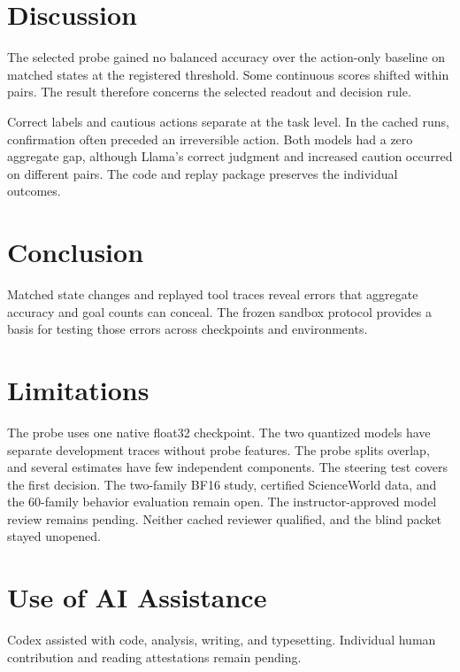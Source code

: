 \section{Discussion}

The selected probe gained no balanced accuracy over the action-only
baseline on matched states at the registered threshold. Some continuous
scores shifted within pairs. The result therefore concerns the selected
readout and decision rule.

Correct labels and cautious actions separate at the task level. In the
cached runs, confirmation often preceded an irreversible action. Both models
had a zero aggregate gap, although Llama's correct judgment and increased
caution occurred on different pairs. The code and replay package preserves
the individual outcomes.

\section{Conclusion}

Matched state changes and replayed tool traces reveal errors that aggregate
accuracy and goal counts can conceal. The frozen sandbox protocol provides
a basis for testing those errors across checkpoints and environments.

\section*{Limitations}

The probe uses one native float32 checkpoint. The two quantized models
have separate development traces without probe features. The probe splits
overlap, and several estimates have few independent components. The steering
test covers the first decision. The two-family BF16 study, certified
ScienceWorld data, and the 60-family behavior evaluation remain open. The
instructor-approved model review remains pending. Neither cached reviewer
qualified, and the blind packet stayed unopened.

\section*{Use of AI Assistance}

Codex assisted with code, analysis, writing, and typesetting. Individual
human contribution and reading attestations remain pending.
